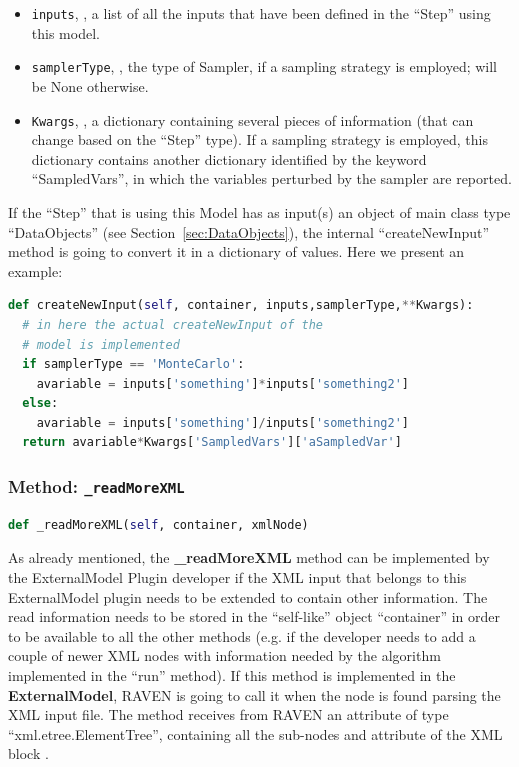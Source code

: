 \begin{itemize}
  \item \texttt{inputs}, , a list of all the inputs that
  have been defined in the ``Step'' using this model.
  \item \texttt{samplerType}, , the type of Sampler, if a
  sampling strategy is employed; will be None otherwise.
  \item \texttt{Kwargs}, , a dictionary containing several
  pieces of information (that can change based on the ``Step'' type).
  If a sampling strategy is employed, this dictionary contains another
  dictionary identified by the keyword ``SampledVars'', in which the variables
  perturbed by the sampler are reported.
\end{itemize}
\nb If the ``Step'' that is using this Model has as input(s) an object of main
class type ``DataObjects'' (see Section~\ref{sec:DataObjects}), the internal ``createNewInput''
method is going to convert it in a dictionary of values.
%
Here we present an example:
\begin{lstlisting}[language=python]
def createNewInput(self, container, inputs,samplerType,**Kwargs):
  # in here the actual createNewInput of the
  # model is implemented
  if samplerType == 'MonteCarlo':
    avariable = inputs['something']*inputs['something2']
  else:
    avariable = inputs['something']/inputs['something2']
  return avariable*Kwargs['SampledVars']['aSampledVar']
\end{lstlisting}

\subsubsection{Method: \texttt{\_readMoreXML}}
\label{subsubsec:externalReadMoreXMLExternalModelPlugin}
\begin{lstlisting}[language=python]
def _readMoreXML(self, container, xmlNode)
\end{lstlisting}
As already mentioned, the \textbf{\_readMoreXML} method can be implemented by the
ExternalModel Plugin developer if the XML input that belongs to this ExternalModel
plugin needs to be extended to contain other information.
%
The read information needs to be stored in the ``self-like'' object ``container''
 in order to be available to all the other methods (e.g. if the developer needs to add a
 couple of newer XML nodes with information needed by the algorithm implemented in
 the ``run'' method).
%
If this method is implemented in the \textbf{ExternalModel}, RAVEN is going to
call it when the node  is found parsing the XML input
file.
%
The method receives from RAVEN an attribute of type ``xml.etree.ElementTree'',
containing all the sub-nodes and attribute of the XML block .
%

